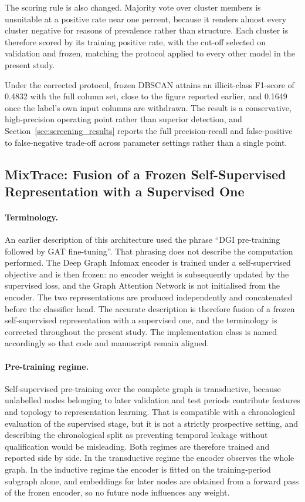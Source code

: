 \documentclass[12pt,a4paper]{article}
\begin{document}
The scoring rule is also changed. Majority vote over cluster
members is unsuitable at a positive rate near one percent,
because it renders almost every cluster negative for reasons of
prevalence rather than structure. Each cluster is therefore
scored by its training positive rate, with the cut-off selected
on validation and frozen, matching the protocol applied to every
other model in the present study.

Under the corrected protocol, frozen DBSCAN attains an
illicit-class F1-score of 0.4832 with the full column set, close
to the figure reported earlier, and 0.1649 once the label's own
input columns are withdrawn. The result is a conservative,
high-precision operating point rather than superior detection,
and Section~\ref{sec:screening_results} reports the full
precision-recall and false-positive to false-negative trade-off
across parameter settings rather than a single point.


\subsection{MixTrace: Fusion of a Frozen Self-Supervised Representation with a Supervised One}
\label{sec:mixtrace_method}

\paragraph{Terminology.}
An earlier description of this architecture used the phrase
``DGI pre-training followed by GAT fine-tuning''. That phrasing
does not describe the computation performed. The Deep Graph
Infomax encoder is trained under a self-supervised objective and
is then frozen: no encoder weight is subsequently updated by the
supervised loss, and the Graph Attention Network is not
initialised from the encoder. The two representations are
produced independently and concatenated before the classifier
head. The accurate description is therefore fusion of a frozen
self-supervised representation with a supervised one, and the
terminology is corrected throughout the present study. The
implementation class is named accordingly so that code and
manuscript remain aligned.

\paragraph{Pre-training regime.}
Self-supervised pre-training over the complete graph is
transductive, because unlabelled nodes belonging to later
validation and test periods contribute features and topology to
representation learning. That is compatible with a chronological
evaluation of the supervised stage, but it is not a strictly
prospective setting, and describing the chronological split as
preventing temporal leakage without qualification would be
misleading. Both regimes are therefore trained and reported side
by side. In the transductive regime the encoder observes the
whole graph. In the inductive regime the encoder is fitted on the
training-period subgraph alone, and embeddings for later nodes
are obtained from a forward pass of the frozen encoder, so no
future node influences any weight.
\end{document}
